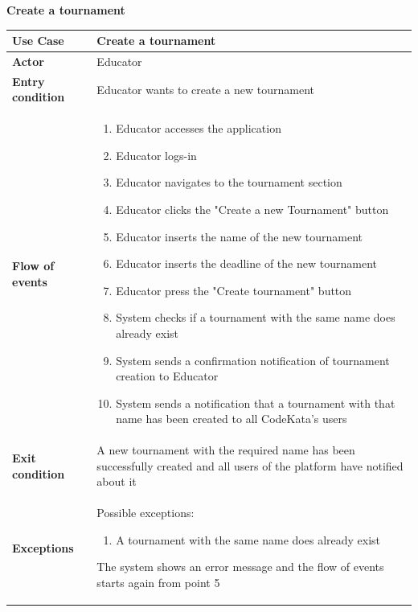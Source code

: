 \documentclass[../RASD.tex]{subfiles}
\begin{document}
        \textbf{Create a tournament}
        \begin{table}[H]
            \begin{center}
                \begin{tabular}{|m{10em}|m{30em}|}
                \hline
                \textbf{Use Case} & Create a tournament\\
                \hline
                \textbf{Actor} & Educator\\
                \hline
                \textbf{Entry condition} & Educator wants to create a new tournament\\
                \hline
                \textbf{Flow of events} & 
                    \begin{enumerate}
                        \item Educator accesses the application
                        \item Educator logs-in
                        \item Educator navigates to the tournament section
                        \item Educator clicks the "Create a new Tournament" button
                        \item Educator inserts the name of the new tournament
                        \item Educator inserts the deadline of the new tournament
                        \item Educator press the "Create tournament" button
                        \item System checks if a tournament with the same name does already exist
                        \item System sends a confirmation notification of tournament creation to Educator
                        \item System sends a notification that a tournament with that name has been created to all CodeKata's users
                    \end{enumerate}\\
                \hline
                \textbf{Exit condition} & A new tournament with the required name has been successfully created and all users of the platform have notified about it\\
                \hline
                \textbf{Exceptions} & 
                    Possible exceptions:
                    \begin{enumerate}
                        \item A tournament with the same name does already exist
                    \end{enumerate}
                    The system shows an error message and the flow of events starts again from point 5\\
                \hline
                \end{tabular}
            \end{center}
        \end{table}\newpage
\end{document}
